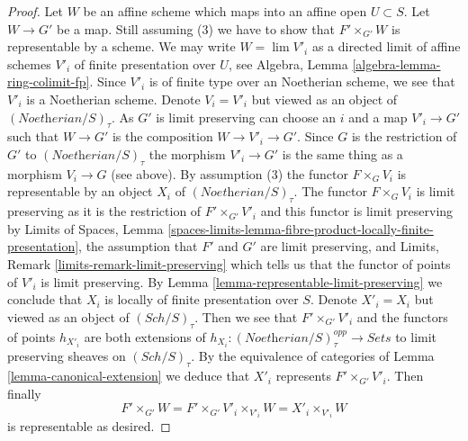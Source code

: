 \documentclass[10pt,a4paper]{amsart}
\theoremstyle{plain}
\theoremstyle{definition}
\theoremstyle{remark}
\numberwithin{equation}{subsection}
\def\lim{\mathop{\mathrm{lim}}\nolimits}
\def\Sch{\mathit{Sch}}
\begin{document}
\begin{proof}
\medskip\noindent
Let $W$ be an affine scheme which maps into an affine open $U \subset S$.
Let $W \to G'$ be a map.
Still assuming (3) we have to show that $F' \times_{G'} W$
is representable by a scheme.
We may write $W = \lim V'_i$ as a directed limit of affine
schemes $V'_i$ of finite presentation over $U$, see
Algebra, Lemma \ref{algebra-lemma-ring-colimit-fp}.
Since $V'_i$ is of finite type over an Noetherian scheme,
we see that $V'_i$ is a Noetherian scheme.
Denote $V_i = V'_i$ but viewed as an object of
$(\textit{Noetherian}/S)_\tau$. As $G'$
is limit preserving can choose an $i$ and a map
$V'_i \to G'$ such that $W \to G'$ is the composition
$W \to V'_i \to G'$. Since $G$ is the restriction of $G'$
to $(\textit{Noetherian}/S)_\tau$ the morphism $V'_i \to G'$
is the same thing as a morphism $V_i \to G$ (see above).
By assumption (3) the functor $F \times_G V_i$ is representable by an object
$X_i$ of $(\textit{Noetherian}/S)_\tau$.
The functor $F \times_G V_i$ is limit preserving
as it is the restriction of $F' \times_{G'} V'_i$
and this functor is limit preserving by
Limits of Spaces, Lemma
\ref{spaces-limits-lemma-fibre-product-locally-finite-presentation},
the assumption that $F'$ and $G'$ are limit preserving, and
Limits, Remark \ref{limits-remark-limit-preserving} which
tells us that the functor of points of $V'_i$ is limit preserving.
By Lemma \ref{lemma-representable-limit-preserving}
we conclude that $X_i$ is locally of finite presentation over $S$.
Denote $X'_i = X_i$ but viewed as an object of
$(\Sch/S)_\tau$. Then we see that $F' \times_{G'} V'_i$
and the functors of points $h_{X'_i}$ are both extensions
of $h_{X_i} : (\textit{Noetherian}/S)_\tau^{opp} \to \textit{Sets}$
to limit preserving sheaves on $(\Sch/S)_\tau$.
By the equivalence of categories of Lemma \ref{lemma-canonical-extension}
we deduce that $X'_i$ represents $F' \times_{G'} V'_i$.
Then finally
$$
F' \times_{G'} W = F' \times_{G'} V'_i \times_{V'_i} W =
X'_i \times_{V'_i} W
$$
is representable as desired.
\end{proof}
\end{document}
